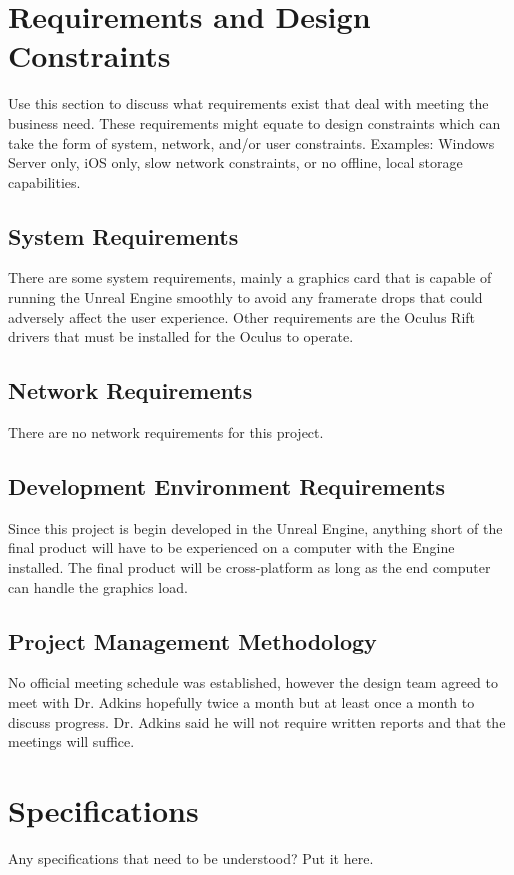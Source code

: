 \hrulefill

\section{Requirements and Design Constraints}
Use this section to discuss what requirements exist that deal with meeting the 
business need.  These requirements might equate to design constraints which can 
take the form of system, network, and/or user constraints.  Examples:  Windows 
Server only, iOS only, slow network constraints, or no offline, local storage capabilities. 


\subsection{System  Requirements}
There are some system requirements, mainly a graphics card that is capable of running the Unreal Engine smoothly to avoid any framerate drops that could adversely affect the user experience.  Other requirements are the Oculus Rift drivers that must be installed for the Oculus to operate.


\subsection{Network Requirements}
There are no network requirements for this project.


\subsection{Development Environment Requirements}
Since this project is begin developed in the Unreal Engine, anything short of the final product will have to be experienced on a computer with the Engine installed.  The final product will be cross-platform as long as the end computer can handle the graphics load.

\subsection{Project  Management Methodology}
No official meeting schedule was established, however the design team agreed to meet with Dr. Adkins hopefully twice a month but at least once a month to discuss progress.  Dr. Adkins said he will not require written reports and that the meetings will suffice.


\section{Specifications}
Any specifications that need to be understood?  Put it here.  

